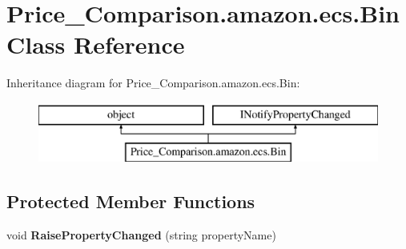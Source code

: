 \hypertarget{class_price___comparison_1_1amazon_1_1ecs_1_1_bin}{\section{Price\-\_\-\-Comparison.\-amazon.\-ecs.\-Bin Class Reference}
\label{class_price___comparison_1_1amazon_1_1ecs_1_1_bin}
}


 


Inheritance diagram for Price\-\_\-\-Comparison.\-amazon.\-ecs.\-Bin\-:\begin{figure}[H]
\begin{center}
\leavevmode
\includegraphics[height=2.000000cm]{class_price___comparison_1_1amazon_1_1ecs_1_1_bin}
\end{center}
\end{figure}
\subsection*{Protected Member Functions}
\begin{DoxyCompactItemize}
\item 
\hypertarget{class_price___comparison_1_1amazon_1_1ecs_1_1_bin_a8d30cb99c41b937cb93dfd750b8a6739}{void {\bfseries Raise\-Property\-Changed} (string property\-Name)}\label{class_price___comparison_1_1amazon_1_1ecs_1_1_bin_a8d30cb99c41b937cb93dfd750b8a6739}

\end{DoxyCompactItemize}
